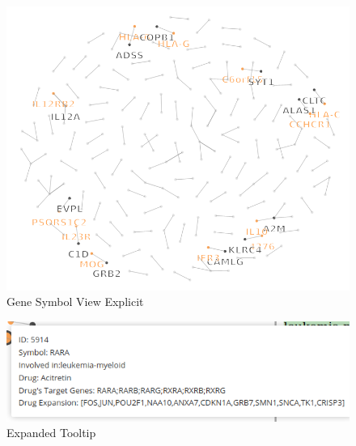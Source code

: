 \documentclass[12pt,twocolumn,twoside]{article}
\begin{document}
	\begin{figure}
		\includegraphics[width=.95\linewidth]{net2.png}
		\caption{Gene Symbol View Explicit}
		\label{net2}
	\end{figure}

\begin{figure}
	\includegraphics[width=.95\linewidth]{etp.png}
	\caption{Expanded Tooltip}
	\label{etp}
\end{figure}

	
	
\end{document}
